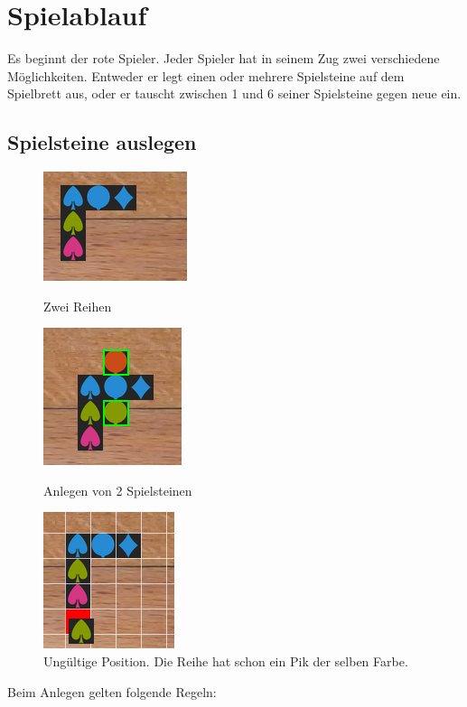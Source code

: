 \documentclass[a4paper, ngerman]{scrartcl}
\begin{document}
\section{Spielablauf}		
	Es beginnt der rote Spieler. Jeder Spieler hat in seinem Zug zwei verschiedene Möglichkeiten. Entweder er legt einen oder mehrere Spielsteine auf dem Spielbrett aus, oder er tauscht zwischen 1 und 6 seiner Spielsteine gegen neue ein.	
	
\subsection{Spielsteine auslegen}
\begin{figure}
	\centering
	\begin{subfigures}
		\includegraphics[scale = 0.7]{images/anlegen01}
		\caption{Zwei Reihen}
		\label{fig:Anlegen01}
		
		\includegraphics[scale = 0.7]{images/anlegen04}
		\caption{Anlegen von 2 Spielsteinen}
		\label{fig:Anlegen02}
		
		\includegraphics[scale = 0.7]{images/anlegen02}
		\caption{Ungültige Position. Die Reihe hat schon ein Pik der selben Farbe.}
		\label{fig:Anlegen03}
	\end{subfigures}	
\end{figure}
Beim Anlegen gelten folgende Regeln:
\end{document}
